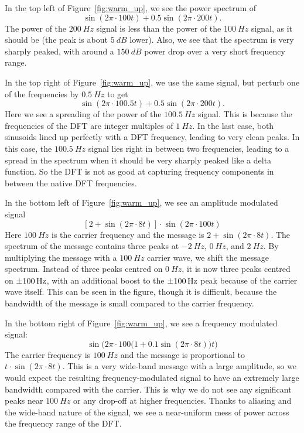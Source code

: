\documentclass[twocolumn]{myarticle}
\begin{document}
In the top left of Figure~\ref{fig:warm_up}, we see the power spectrum of 
\[ 
    \sin(2 \pi \cdot 100 t) + 0.5 \sin (2 \pi \cdot 200 t) . 
\]
The power of the $ \SI{200}{Hz} $ signal is less than the power of the $ \SI{100}{Hz} $ signal, as it should be (the peak is about $ \SI{5}{dB} $ lower).
Also, we see that the spectrum is very sharply peaked, with around a $ \SI{150}{dB} $ power drop over a very short frequency range.

In the top right of Figure~\ref{fig:warm_up}, we use the same signal, but perturb one of the frequencies by $ \SI{0.5}{Hz} $ to get
\[
    \sin(2 \pi \cdot 100.5 t) + 0.5 \sin (2 \pi \cdot 200 t) . 
\]
Here we see a spreading of the power of the $ \SI{100.5}{Hz} $ signal.
This is because the frequencies of the DFT are integer multiples of $ \SI{1}{Hz} $.
In the last case, both sinusoids lined up perfectly with a DFT frequency, leading to very clean peaks. 
In this case, the $ \SI{100.5}{Hz} $ signal lies right in between two frequencies, leading to a spread in the spectrum when it should be very sharply peaked like a delta function.
So the DFT is not as good at capturing frequency components in between the native DFT frequencies.

In the bottom left of Figure~\ref{fig:warm_up}, we see an amplitude modulated signal
\[
    \left[ 2 + \sin(2\pi \cdot 8 t) \right] \cdot \sin ( 2 \pi \cdot 100 t)
\]
Here $ \SI{100}{Hz} $ is the carrier frequency and the message is $ 2 + \sin(2 \pi \cdot 8 t) $.
The spectrum of the message contains three peaks at $ \SI{-2}{Hz} $, $ \SI{0}{Hz} $, and $ \SI{2}{Hz} $.
By multiplying the message with a $ \SI{100}{Hz} $ carrier wave, we shift the message spectrum.
Instead of three peaks centred on $ \SI{0}{Hz} $, it is now three peaks centred on $ \SI{+-100}{Hz} $, with an additional boost to the $ \SI{+-100}{Hz} $ peak because of the carrier wave itself.
This can be seen in the figure, though it is difficult, because the bandwidth of the message is small compared to the carrier frequency.

In the bottom right of Figure~\ref{fig:warm_up}, we see a frequency modulated signal:
\[
    \sin \Big( 2 \pi \cdot 100 \big( 1 + 0.1 \sin (2 \pi \cdot 8 t) \big) t \Big)
\]
The carrier frequency is $ \SI{100}{Hz} $ and the message is proportional to $ t \cdot \sin(2 \pi \cdot 8 t) $.
This is a very wide-band message with a large amplitude, so we would expect the resulting frequency-modulated signal to have an extremely large bandwidth compared with the carrier.
This is why we do not see any significant peaks near $ \SI{100}{Hz} $ or any drop-off at higher frequencies.
Thanks to aliasing and the wide-band nature of the signal, we see a near-uniform mess of power across the frequency range of the DFT.
\end{document}
